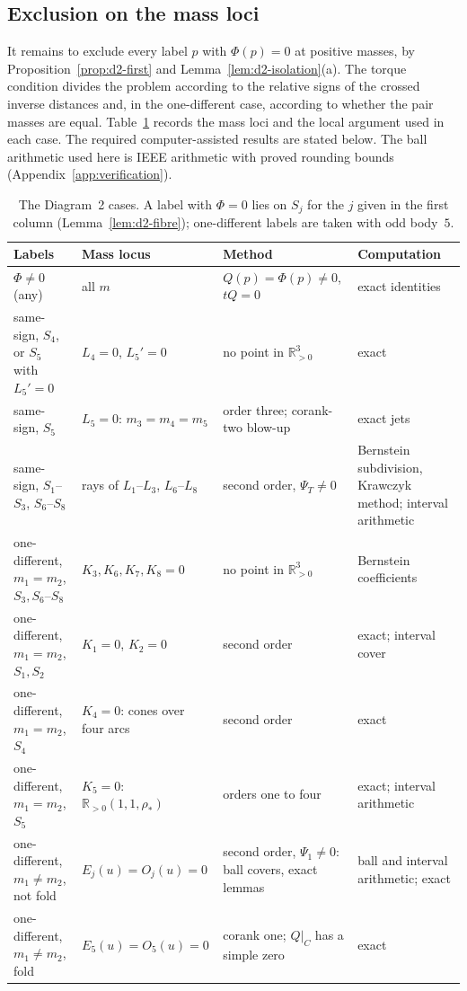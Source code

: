 \documentclass[11pt]{amsart}
\theoremstyle{definition}
\theoremstyle{remark}
\newcommand{\Rp}{\mathbb{R}_{>0}}
\begin{document}
\subsection{\texorpdfstring{Exclusion on the mass loci}{Exclusion on the mass loci}}\label{sec:d2-cases}

{It remains to exclude every label $p$ with $\Phi(p)=0$ at positive
masses, by Proposition~\ref{prop:d2-first} and Lemma~\ref{lem:d2-isolation}(a).
The torque condition divides the problem according to the relative signs of the crossed
inverse distances and, in the one-different case, according to whether the pair masses
are equal.  Table~\ref{tab:d2-cases} records the mass loci and the local argument used in
each case.  The required computer-assisted results are stated below.
The ball arithmetic used here is IEEE arithmetic with proved rounding bounds
(Appendix~\ref{app:verification}).}

\begin{table}[ht]
\centering
\footnotesize
\setlength{\tabcolsep}{3pt}
\begin{tabular}{p{2.5cm}p{2.5cm}p{3.3cm}p{3.4cm}}
\hline
Labels & Mass locus & Method & Computation \\
\hline
$\Phi\ne0$ (any) & all $m$ & {$Q(p)=\Phi(p)\ne0$, $tQ=0$} & exact identities \\
same-sign, $S_4$, or $S_5$ with $L_5'=0$ & $L_4=0$, $L_5'=0$ & no point in $\Rp^3$ & exact \\
same-sign, $S_5$ & $L_5=0$: $m_3=m_4=m_5$ & order three; corank-two blow-up & exact jets \\
same-sign, $S_1$--$S_3$, $S_6$--$S_8$ & rays of $L_1$--$L_3$, $L_6$--$L_8$ & second order,
{$\Psi_T\ne0$} & Bernstein subdivision, Krawczyk method; interval arithmetic \\
\hline
one-different, $m_1=m_2$, $S_3,S_6$--$S_8$ & $K_3,K_6,K_7,K_8=0$ & no point in $\Rp^3$ &
Bernstein coefficients \\
one-different, $m_1=m_2$, $S_1,S_2$ & $K_1=0$, $K_2=0$ & second order & exact; interval cover \\
one-different, $m_1=m_2$, $S_4$ & {$K_4=0$: cones over four arcs} & second order & exact \\
one-different, $m_1=m_2$, $S_5$ & $K_5=0$: $\Rp(1,1,\rho_*)$ & orders one to four &
exact; interval arithmetic \\
\hline
one-different, $m_1\ne m_2$, not fold & $E_j(u)=O_j(u)=0$ & second order, $\Psi_1\ne0$: ball
covers, exact lemmas & ball and interval arithmetic; exact \\
one-different, $m_1\ne m_2$, fold & $E_5(u)=O_5(u)=0$ & corank one; $Q|_C$ has a simple zero &
exact \\
\hline
\end{tabular}
\caption{The Diagram~2 cases.  A label with $\Phi=0$ lies on $S_j$ for the $j$ given in the
first column (Lemma~\ref{lem:d2-fibre}); one-different labels are taken with odd body~$5$.}
\label{tab:d2-cases}
\end{table}
\end{document}
